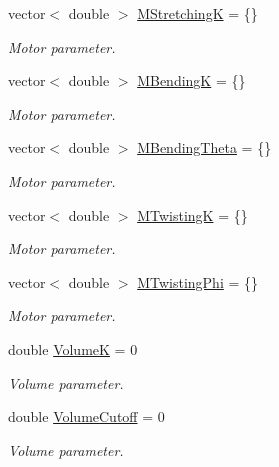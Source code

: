 {\bf }\par
\begin{DoxyCompactItemize}
\item 
vector$<$ double $>$ \hyperlink{structMechanicsParameters_a36650ee6fc8a98f94b6594e67d4b34f5}{M\+Stretching\+K} = \{\}
\begin{DoxyCompactList}\small\item\em Motor parameter. \end{DoxyCompactList}\item 
vector$<$ double $>$ \hyperlink{structMechanicsParameters_abbc374692e6df3c7532e085918a98c4c}{M\+Bending\+K} = \{\}
\begin{DoxyCompactList}\small\item\em Motor parameter. \end{DoxyCompactList}\item 
vector$<$ double $>$ \hyperlink{structMechanicsParameters_a597e2027d01d684f5dfe90d8a2734a90}{M\+Bending\+Theta} = \{\}
\begin{DoxyCompactList}\small\item\em Motor parameter. \end{DoxyCompactList}\item 
vector$<$ double $>$ \hyperlink{structMechanicsParameters_a3efad448cc6428dcb081d2778655ec12}{M\+Twisting\+K} = \{\}
\begin{DoxyCompactList}\small\item\em Motor parameter. \end{DoxyCompactList}\item 
vector$<$ double $>$ \hyperlink{structMechanicsParameters_abff44b81c046945ed8277a522b741ac8}{M\+Twisting\+Phi} = \{\}
\begin{DoxyCompactList}\small\item\em Motor parameter. \end{DoxyCompactList}\end{DoxyCompactItemize}

{\bf }\par
\begin{DoxyCompactItemize}
\item 
double \hyperlink{structMechanicsParameters_a49a5ad4e84d9c8acafc8bd38018245d1}{Volume\+K} = 0
\begin{DoxyCompactList}\small\item\em Volume parameter. \end{DoxyCompactList}\item 
double \hyperlink{structMechanicsParameters_a597ef187ef21d3eca159e00264bf425c}{Volume\+Cutoff} = 0
\begin{DoxyCompactList}\small\item\em Volume parameter. \end{DoxyCompactList}\end{DoxyCompactItemize}



